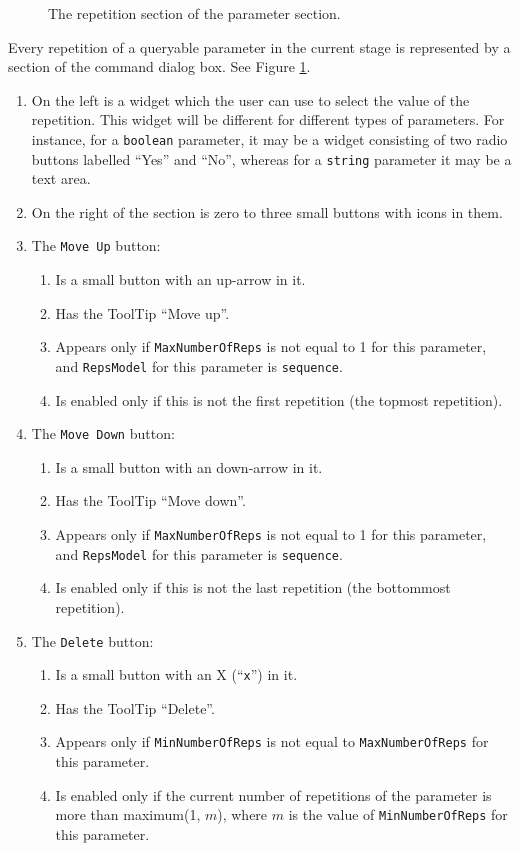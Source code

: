 \documentclass[11pt]{article}
\begin{document}
\begin{figure}

\centerline{\epsfxsize=5.5in }

\caption{
  The repetition section of the parameter section.
}
\label{repetitionSectionFig}
\end{figure}

Every repetition of a queryable parameter in the current stage is
represented by a section of the command dialog box.  See Figure
\ref{repetitionSectionFig}.
\begin{enumerate}
\item On the left is a widget which the user can use to select the
  value of the repetition.  This widget will be different for different
  types of parameters.  For instance, for a {\tt boolean} parameter,
  it may be a widget consisting of two radio buttons labelled ``Yes''
  and ``No'', whereas for a {\tt string} parameter it may be a
  text area.
\item On the right of the section is zero to three small buttons
  with icons in them.
\item The {\tt Move Up} button:
  \begin{enumerate}
  \item Is a small button with an up-arrow in it.
  \item Has the ToolTip ``Move up''.
  \item Appears only if
    {\tt MaxNumberOfReps} is not equal to 1 for this parameter, and
    {\tt RepsModel} for this parameter is {\tt sequence}.
  \item Is enabled only if this is not the first repetition (the topmost
    repetition).
  \end{enumerate}
\item The {\tt Move Down} button:
  \begin{enumerate}
  \item Is a small button with an down-arrow in it.
  \item Has the ToolTip ``Move down''.
  \item Appears only if
    {\tt MaxNumberOfReps} is not equal to 1 for this parameter, and
    {\tt RepsModel} for this parameter is {\tt sequence}.
  \item Is enabled only if this is not the last repetition (the bottommost
    repetition).
  \end{enumerate}
\item The {\tt Delete} button:
  \begin{enumerate}
  \item Is a small button with an X (``\verb/x/'') in it.
  \item Has the ToolTip ``Delete''.
  \item Appears only if {\tt MinNumberOfReps} is not equal to
    {\tt MaxNumberOfReps} for this parameter.
  \item Is enabled only if the current number of repetitions of the
    parameter is more than maximum(1, $m$), where $m$ is the value
    of {\tt MinNumberOfReps} for this parameter.
  \end{enumerate}
\end{enumerate}
\end{document}
